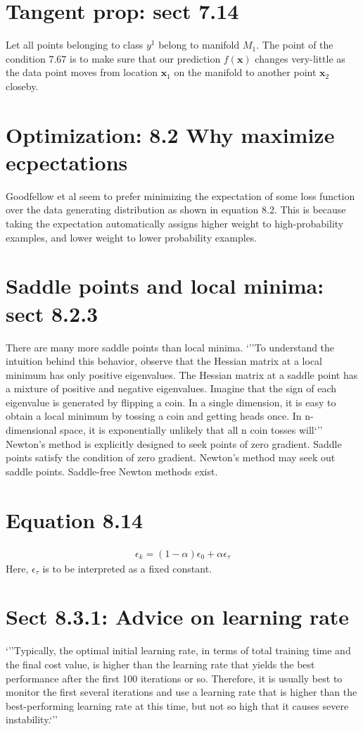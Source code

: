 \documentclass{article}
\newcommand{\ber}{\begin{eqnarray}}
\newcommand{\eer}{\end{eqnarray}}
\begin{document}
\section{Tangent prop: sect 7.14}
Let all points belonging to class $y^1$ belong to manifold $M_1$. The point of the condition 7.67 is to make sure that our prediction $f(\pmb{x})$ changes very-little as the data point moves from location $\pmb{x}_1$ on the manifold to another point $\pmb{x}_2$ closeby. 
%
%
%
\section{Optimization: 8.2 Why maximize ecpectations}
Goodfellow et al seem to prefer minimizing the expectation of some loss function over the data generating distribution as shown in equation 8.2. This is because taking the expectation automatically assigns higher weight to high-probability examples, and lower weight to lower probability examples.
%
%
%
\section{Saddle points and local minima: sect 8.2.3}
There are many more saddle points than local minima. `''To understand the intuition behind this behavior, observe
that the Hessian matrix at a local minimum has only positive eigenvalues. The
Hessian matrix at a saddle point has a mixture of positive and negative eigenvalues.
Imagine that the sign of each eigenvalue is generated by ﬂipping a coin. In a single
dimension, it is easy to obtain a local minimum by tossing a coin and getting heads
once. In n-dimensional space, it is exponentially unlikely that all n coin tosses will`''\\

Newton's method is explicitly designed to seek points of zero gradient. Saddle points satisfy the condition of zero gradient. Newton's method may seek out saddle points. Saddle-free Newton methods exist.

%
%
%
\section{Equation 8.14}
\ber
\epsilon_k = (1-\alpha)\epsilon_0 + \alpha\epsilon_{\tau}
\eer
Here, $\epsilon_{\tau}$ is to be interpreted as a fixed constant.

\section{Sect 8.3.1: Advice on learning rate}
`''Typically, the optimal initial learning rate, in terms of total training time and the
ﬁnal cost value, is higher than the learning rate that yields the best performance
after the ﬁrst 100 iterations or so. Therefore, it is usually best to monitor the ﬁrst
several iterations and use a learning rate that is higher than the best-performing
learning rate at this time, but not so high that it causes severe instability.`''
%
%
%
\end{document}
